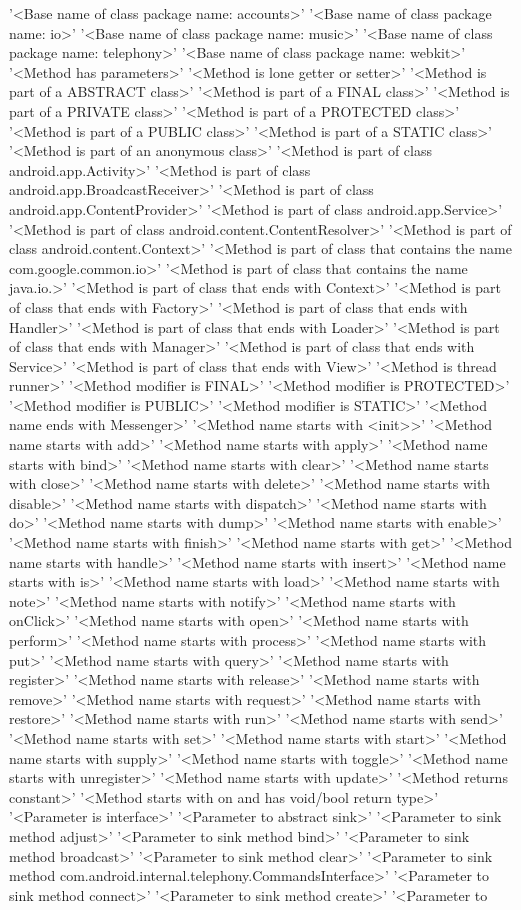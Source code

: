 '<Base name of class package name: accounts>'	'<Base name of class package name: io>'	'<Base name of class package name: music>'	'<Base name of class package name: telephony>'	'<Base name of class package name: webkit>'	'<Method has parameters>'	'<Method is lone getter or setter>'	'<Method is part of a ABSTRACT class>'	'<Method is part of a FINAL class>'	'<Method is part of a PRIVATE class>'	'<Method is part of a PROTECTED class>'	'<Method is part of a PUBLIC class>'	'<Method is part of a STATIC class>'	'<Method is part of an anonymous class>'	'<Method is part of class android.app.Activity>'	'<Method is part of class android.app.BroadcastReceiver>'	'<Method is part of class android.app.ContentProvider>'	'<Method is part of class android.app.Service>'	'<Method is part of class android.content.ContentResolver>'	'<Method is part of class android.content.Context>'	'<Method is part of class that contains the name com.google.common.io>'	'<Method is part of class that contains the name java.io.>'	'<Method is part of class that ends with Context>'	'<Method is part of class that ends with Factory>'	'<Method is part of class that ends with Handler>'	'<Method is part of class that ends with Loader>'	'<Method is part of class that ends with Manager>'	'<Method is part of class that ends with Service>'	'<Method is part of class that ends with View>'	'<Method is thread runner>'	'<Method modifier is FINAL>'	'<Method modifier is PROTECTED>'	'<Method modifier is PUBLIC>'	'<Method modifier is STATIC>'	'<Method name ends with Messenger>'	'<Method name starts with <init>>'	'<Method name starts with add>'	'<Method name starts with apply>'	'<Method name starts with bind>'	'<Method name starts with clear>'	'<Method name starts with close>'	'<Method name starts with delete>'	'<Method name starts with disable>'	'<Method name starts with dispatch>'	'<Method name starts with do>'	'<Method name starts with dump>'	'<Method name starts with enable>'	'<Method name starts with finish>'	'<Method name starts with get>'	'<Method name starts with handle>'	'<Method name starts with insert>'	'<Method name starts with is>'	'<Method name starts with load>'	'<Method name starts with note>'	'<Method name starts with notify>'	'<Method name starts with onClick>'	'<Method name starts with open>'	'<Method name starts with perform>'	'<Method name starts with process>'	'<Method name starts with put>'	'<Method name starts with query>'	'<Method name starts with register>'	'<Method name starts with release>'	'<Method name starts with remove>'	'<Method name starts with request>'	'<Method name starts with restore>'	'<Method name starts with run>'	'<Method name starts with send>'	'<Method name starts with set>'	'<Method name starts with start>'	'<Method name starts with supply>'	'<Method name starts with toggle>'	'<Method name starts with unregister>'	'<Method name starts with update>'	'<Method returns constant>'	'<Method starts with on and has void/bool return type>'	'<Parameter is interface>'	'<Parameter to abstract sink>'	'<Parameter to sink method adjust>'	'<Parameter to sink method bind>'	'<Parameter to sink method broadcast>'	'<Parameter to sink method clear>'	'<Parameter to sink method com.android.internal.telephony.CommandsInterface>'	'<Parameter to sink method connect>'	'<Parameter to sink method create>'	'<Parameter to 